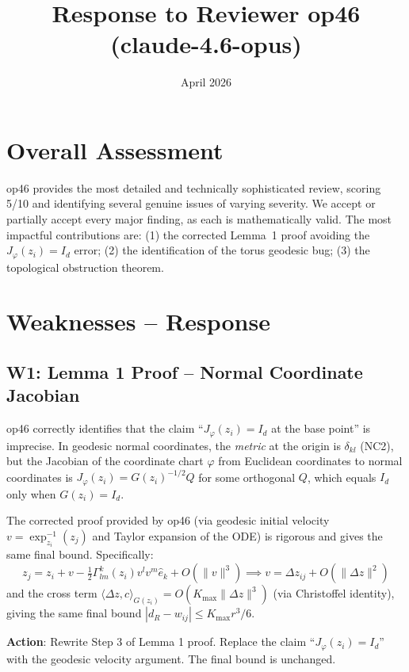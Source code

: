 \documentclass{article}
\title{Response to Reviewer op46 (claude-4.6-opus)}
\date{April 2026}
\begin{document}
\maketitle

\section{Overall Assessment}

op46 provides the most detailed and technically sophisticated review, scoring
5/10 and identifying several genuine issues of varying severity. We accept or
partially accept every major finding, as each is mathematically valid. The most
impactful contributions are: (1) the corrected Lemma~1 proof avoiding the
$J_\varphi(z_i) = I_d$ error; (2) the identification of the torus geodesic
bug; (3) the topological obstruction theorem.

\section{Weaknesses -- Response}

\subsection{W1: Lemma 1 Proof -- Normal Coordinate Jacobian}

\begin{accept}
op46 correctly identifies that the claim ``$J_\varphi(z_i) = I_d$ at the base
point'' is imprecise. In geodesic normal coordinates, the \emph{metric} at the
origin is $\delta_{kl}$ (NC2), but the Jacobian of the coordinate chart
$\varphi$ from Euclidean coordinates to normal coordinates is
$J_\varphi(z_i) = G(z_i)^{-1/2}Q$ for some orthogonal $Q$, which equals $I_d$
only when $G(z_i) = I_d$.

The corrected proof provided by op46 (via geodesic initial velocity $v =
\exp_{z_i}^{-1}(z_j)$ and Taylor expansion of the ODE) is rigorous and gives
the same final bound. Specifically:
\[
  z_j = z_i + v - \tfrac{1}{2}\Gamma^k_{lm}(z_i)v^l v^m \hat{e}_k + O(\|v\|^3)
  \implies v = \Delta z_{ij} + O(\|\Delta z\|^2)
\]
and the cross term $\langle \Delta z, c \rangle_{G(z_i)} = O(K_{\max}\|\Delta z\|^3)$
(via Christoffel identity), giving the same final bound $|d_R - w_{ij}| \leq
K_{\max}r^3/6$.

\textbf{Action}: Rewrite Step 3 of Lemma 1 proof. Replace the claim
``$J_\varphi(z_i) = I_d$'' with the geodesic velocity argument. The final
bound is unchanged.
\end{accept}
\end{document}
